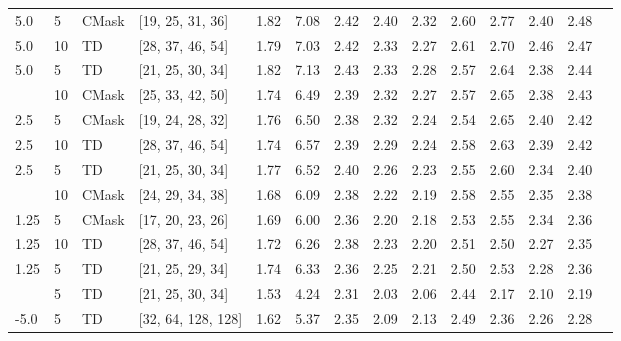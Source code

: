 \begin{tabular}{llllrrrrrrrrrr}
5.0 & 5 & CMask & [19, 25, 31, 36] & \cellcolor{green!20}1.82 & \cellcolor{green!20}7.08 & \cellcolor{green!20}2.42 & 2.40 & 2.32 & \cellcolor{green!20}2.60 & 2.77 & 2.40 & 2.48 \\
5.0 & 10 & TD & [28, 37, 46, 54] & 1.79 & 7.03 & 2.42 & \cellcolor{green!20}2.33 & 2.27 & \cellcolor{green!20}2.61 & \cellcolor{green!20}2.70 & \cellcolor{green!20}2.46 & \cellcolor{green!50}2.47 \\
5.0 & 5 & TD & [21, 25, 30, 34] & \cellcolor{green!20}1.82 & \cellcolor{green!20}7.13 & \cellcolor{green!20}2.43 & 2.33 & \cellcolor{green!20}2.28 & 2.57 & 2.64 & 2.38 & 2.44 \\
\hdashline
\midrule
2.5 & 10 & CMask & [25, 33, 42, 50] & 1.74 & 6.49 & \cellcolor{green!20}2.39 & \cellcolor{green!20}2.32 & \cellcolor{green!20}2.27 & \cellcolor{green!20}2.57 & \cellcolor{green!20}2.65 & 2.38 & \cellcolor{green!50}2.43 \\
2.5 & 5 & CMask & [19, 24, 28, 32] & \cellcolor{green!20}1.76 & \cellcolor{green!20}6.50 & 2.38 & 2.32 & 2.24 & 2.54 & 2.65 & \cellcolor{green!20}2.40 & 2.42 \\
2.5 & 10 & TD & [28, 37, 46, 54] & 1.74 & \cellcolor{green!20}6.57 & 2.39 & \cellcolor{green!20}2.29 & \cellcolor{green!20}2.24 & \cellcolor{green!20}2.58 & \cellcolor{green!20}2.63 & \cellcolor{green!20}2.39 & \cellcolor{green!50}2.42 \\
2.5 & 5 & TD & [21, 25, 30, 34] & \cellcolor{green!20}1.77 & 6.52 & \cellcolor{green!20}2.40 & 2.26 & 2.23 & 2.55 & 2.60 & 2.34 & 2.40 \\
\hdashline
\midrule
1.25 & 10 & CMask & [24, 29, 34, 38] & 1.68 & \cellcolor{green!20}6.09 & \cellcolor{green!20}2.38 & \cellcolor{green!20}2.22 & \cellcolor{green!20}2.19 & \cellcolor{green!20}2.58 & \cellcolor{green!20}2.55 & \cellcolor{green!20}2.35 & \cellcolor{green!50}2.38 \\
1.25 & 5 & CMask & [17, 20, 23, 26] & \cellcolor{green!20}1.69 & 6.00 & 2.36 & 2.20 & 2.18 & 2.53 & 2.55 & 2.34 & 2.36 \\
1.25 & 10 & TD & [28, 37, 46, 54] & 1.72 & 6.26 & \cellcolor{green!20}2.38 & 2.23 & 2.20 & \cellcolor{green!20}2.51 & 2.50 & 2.27 & 2.35 \\
1.25 & 5 & TD & [21, 25, 29, 34] & \cellcolor{green!20}1.74 & \cellcolor{green!20}6.33 & 2.36 & \cellcolor{green!20}2.25 & \cellcolor{green!20}2.21 & 2.50 & \cellcolor{green!20}2.53 & \cellcolor{green!20}2.28 & \cellcolor{green!50}2.36 \\
\hdashline
\midrule
-5.0 & 5 & TD & [21, 25, 30, 34] & 1.53 & 4.24 & 2.31 & 2.03 & 2.06 & 2.44 & 2.17 & 2.10 & 2.19 \\
-5.0 & 5 & TD & [32, 64, 128, 128] & \cellcolor{green!20}1.62 & \cellcolor{green!20}5.37 & \cellcolor{green!20}2.35 & \cellcolor{green!20}2.09 & \cellcolor{green!20}2.13 & \cellcolor{green!20}2.49 & \cellcolor{green!20}2.36 & \cellcolor{green!20}2.26 & \cellcolor{green!50}2.28 \\
\bottomrule
\end{tabular}